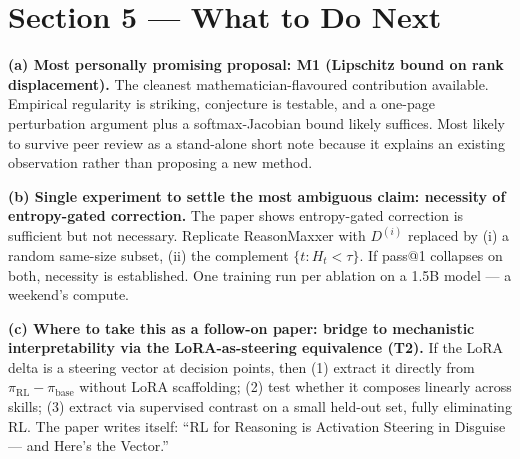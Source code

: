 \documentclass[11pt]{article}
\begin{document}
\section*{Section 5 --- What to Do Next}

\textbf{(a) Most personally promising proposal: M1 (Lipschitz bound on rank displacement).} The cleanest mathematician-flavoured contribution available. Empirical regularity is striking, conjecture is testable, and a one-page perturbation argument plus a softmax-Jacobian bound likely suffices. Most likely to survive peer review as a stand-alone short note because it explains an existing observation rather than proposing a new method.

\textbf{(b) Single experiment to settle the most ambiguous claim: necessity of entropy-gated correction.} The paper shows entropy-gated correction is sufficient but not necessary. Replicate ReasonMaxxer with $D^{(i)}$ replaced by (i) a random same-size subset, (ii) the complement $\{t : H_t < \tau\}$. If pass@1 collapses on both, necessity is established. One training run per ablation on a 1.5B model --- a weekend's compute.

\textbf{(c) Where to take this as a follow-on paper: bridge to mechanistic interpretability via the LoRA-as-steering equivalence (T2).} If the LoRA delta is a steering vector at decision points, then (1) extract it directly from $\pi_{\text{RL}} - \pi_{\text{base}}$ without LoRA scaffolding; (2) test whether it composes linearly across skills; (3) extract via supervised contrast on a small held-out set, fully eliminating RL. The paper writes itself: ``RL for Reasoning is Activation Steering in Disguise --- and Here's the Vector.''
\end{document}
